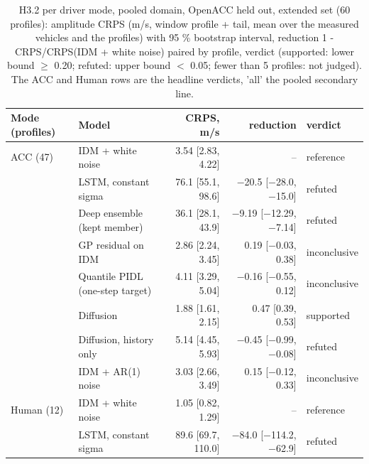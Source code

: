 \begin{table}[htbp]
\centering
\small
\caption{H3.2 per driver mode, pooled domain, OpenACC held out, extended set (60 profiles): amplitude CRPS (m/s, window profile + tail, mean over the measured vehicles and the profiles) with 95 \% bootstrap interval, reduction 1 - CRPS/CRPS(IDM + white noise) paired by profile, verdict (supported: lower bound $\geq$ 0.20; refuted: upper bound $<$ 0.05; fewer than 5 profiles: not judged). The ACC and Human rows are the headline verdicts, 'all' the pooled secondary line.}
\label{tab:t5-h32--e3--lodo-openacc}
\begin{tabular}{llrrl}
\toprule
Mode (profiles) & Model & CRPS, m/s & reduction & verdict \\
\midrule
ACC (47) & IDM + white noise & 3.54 [2.83, 4.22] & -- & reference \\
 & LSTM, constant sigma & 76.1 [55.1, 98.6] & $-$20.5 [$-$28.0, $-$15.0] & refuted \\
 & Deep ensemble (kept member) & 36.1 [28.1, 43.9] & $-$9.19 [$-$12.29, $-$7.14] & refuted \\
 & GP residual on IDM & 2.86 [2.24, 3.45] & 0.19 [$-$0.03, 0.38] & inconclusive \\
 & Quantile PIDL (one-step target) & 4.11 [3.29, 5.04] & $-$0.16 [$-$0.55, 0.12] & inconclusive \\
 & Diffusion & 1.88 [1.61, 2.15] & 0.47 [0.39, 0.53] & supported \\
 & Diffusion, history only & 5.14 [4.45, 5.93] & $-$0.45 [$-$0.99, $-$0.08] & refuted \\
 & IDM + AR(1) noise & 3.03 [2.66, 3.49] & 0.15 [$-$0.12, 0.33] & inconclusive \\
\midrule
Human (12) & IDM + white noise & 1.05 [0.82, 1.29] & -- & reference \\
 & LSTM, constant sigma & 89.6 [69.7, 110.0] & $-$84.0 [$-$114.2, $-$62.9] & refuted \\

\end{tabular}
\end{table}
